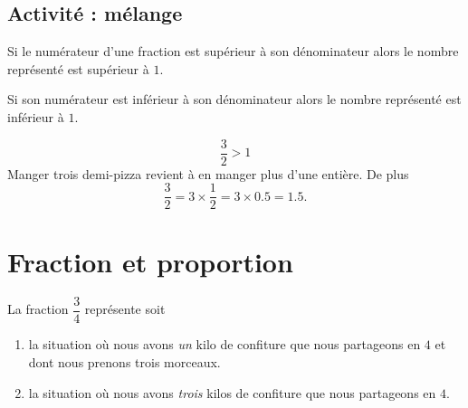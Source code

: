 \subsection*{Activité : mélange}



\begin{Aretenir}
Si le numérateur d'une fraction est supérieur à son dénominateur alors le nombre représenté est supérieur à $1$.

Si son numérateur est inférieur à son dénominateur alors le nombre représenté est inférieur à $1$.
\end{Aretenir}

\begin{example}
    \begin{equation}
        \frac{ 3 }{ 2 }>1
    \end{equation}
    Manger trois demi-pizza revient à en manger plus d'une entière. De plus
    \begin{equation}
        \frac{ 3 }{ 2 }=3\times \frac{ 1 }{2}=3\times 0.5=1.5.
    \end{equation}
\end{example}

\section{Fraction et proportion}

\begin{example}
    La fraction \( \dfrac{ 3 }{ 4 }\) représente soit
    \begin{enumerate}
        \item
            la situation où nous avons \emph{un} kilo de confiture que nous partageons en \( 4\) et dont nous prenons trois morceaux.
        \item
            la situation où nous avons \emph{trois} kilos de confiture que nous partageons en \( 4\).
    \end{enumerate}
\end{example}

